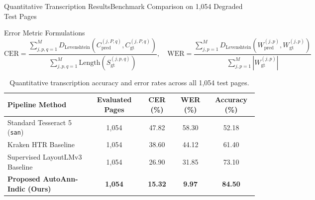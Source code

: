 \documentclass[aspectratio=169]{beamer}
\begin{document}
\begin{frame}{Quantitative Transcription Results}{Benchmark Comparison on 1,054 Degraded Test Pages}
\begin{block}{Error Metric Formulations}
\[
  \text{CER} = \frac{\sum_{j,p,q=1}^M D_{\text{Levenshtein}}(C_{\text{pred}}^{(j,P,q)}, C_{\text{gt}}^{(j,P,q)})}{\sum_{j,p,q=1}^M \text{Length}(S_{\text{gt}}^{(j,p,q)})}, \quad \text{WER} = \frac{\sum_{j,p=1}^M D_{\text{Levenshtein}}(W_{\text{pred}}^{(j,p)}, W_{\text{gt}}^{(j,p)})}{\sum_{j,p=1}^M |W_{\text{gt}}^{(j,p)}|}
\]
\end{block}
\begin{table}
  \centering
  \small
  \begin{tabular}{lcccc}
    \toprule
    \textbf{Pipeline Method} & \textbf{Evaluated Pages} & \textbf{CER (\%)} & \textbf{WER (\%)} & \textbf{Accuracy (\%)} \\
    \midrule
    Standard Tesseract 5 (\texttt{san}) & 1,054 & 47.82 & 58.30 & 52.18 \\
    Kraken HTR Baseline & 1,054 & 38.60 & 44.12 & 61.40 \\
    Supervised LayoutLMv3 Baseline & 1,054 & 26.90 & 31.85 & 73.10 \\
    \textbf{Proposed AutoAnn-Indic (Ours)} & \textbf{1,054} & \textbf{15.32} & \textbf{9.97} & \textbf{84.50} \\
    \bottomrule
  \end{tabular}
  \caption{Quantitative transcription accuracy and error rates across all 1,054 test pages.}
\end{table}
\end{frame}
\end{document}

